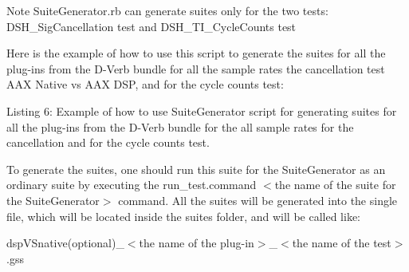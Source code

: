 \begin{DoxyNote}{Note}
Suite\+Generator.\+rb can generate suites only for the two tests\+: D\+S\+H\+\_\+\+Sig\+Cancellation test and D\+S\+H\+\_\+\+T\+I\+\_\+\+Cycle\+Counts test
\end{DoxyNote}
Here is the example of how to use this script to generate the suites for all the plug-\/ins from the \textquotesingle{}D-\/\+Verb\textquotesingle{} bundle for all the sample rates the cancellation test A\+AX Native vs A\+AX D\+SP, and for the cycle counts test\+:


\begin{DoxyCode}{0}
\DoxyCodeLine{\textcolor{preprocessor}{\# Generate suite for Cancellation test: AAX Native vs AAX DSP}}
\DoxyCodeLine{\textcolor{preprocessor}{\# Generate suite for Instance Count test}}
\end{DoxyCode}
 Listing 6\+: Example of how to use Suite\+Generator script for generating suites for all the plug-\/ins from the \textquotesingle{}D-\/\+Verb\textquotesingle{} bundle for the all sample rates for the cancellation and for the cycle counts test.

To generate the suites, one should run this suite for the Suite\+Generator as an ordinary suite by executing the {\ttfamily run\+\_\+test.\+command $<$the name of the suite for the Suite\+Generator$>$} command. All the suites will be generated into the single file, which will be located inside the suites folder, and will be called like\+:

{\ttfamily dsp\+V\+Snative(optional)\+\_\+$<$the name of the plug-\/in$>$\+\_\+$<$the name of the test$>$.gss}

